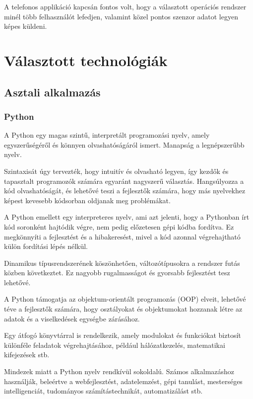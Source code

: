 \documentclass[
]{thesis-ekf}
\theoremstyle{definition}
\theoremstyle{remark}
\begin{document}
A telefonos applikáció kapcsán fontos volt, hogy a választott operációs rendszer minél több felhasználót lefedjen, valamint közel pontos szenzor adatot legyen képes küldeni.

\section{Választott technológiák}
\subsection{Asztali alkalmazás}
\subsubsection{Python}
A Python egy magas szintű, interpretált programozási nyelv, amely egyszerűségéről és könnyen olvashatóságáról ismert. Manapság a legnépszerűbb nyelv.

Szintaxisát úgy tervezték, hogy intuitív és olvasható legyen, így kezdők és tapasztalt programozók számára egyaránt nagyszerű választás. Hangsúlyozza a kód olvashatóságát, és lehetővé teszi a fejlesztők számára, hogy más nyelvekhez képest kevesebb kódsorban oldjanak meg problémákat.

A Python emellett egy interpreteres  nyelv, ami azt jelenti, hogy a Pythonban írt kód soronként hajtódik végre, nem pedig előzetesen gépi kódba fordítva. Ez megkönnyíti a fejlesztést és a hibakeresést, mivel a kód azonnal végrehajtható külön fordítási lépés nélkül.

Dinamikus típusrendszerének köszönhetően, változótípusokra a rendszer futás közben következtet. Ez nagyobb rugalmasságot és gyorsabb fejlesztést tesz lehetővé.

A Python támogatja az objektum-orientált programozás (OOP) elveit, lehetővé téve a fejlesztők számára, hogy osztályokat és objektumokat hozzanak létre az adatok és a viselkedések egységbe zárásához.

Egy átfogó könyvtárral is rendelkezik, amely modulokat és funkciókat biztosít különféle feladatok végrehajtásához, például hálózatkezelés, matematikai kifejezések stb.

Mindezek miatt a Python nyelv rendkívül sokoldalú. Számos alkalmazáshoz használják, beleértve a webfejlesztést, adatelemzést, gépi tanulást, mesterséges intelligenciát, tudományos számítástechnikát, automatizálást stb.
\end{document}
